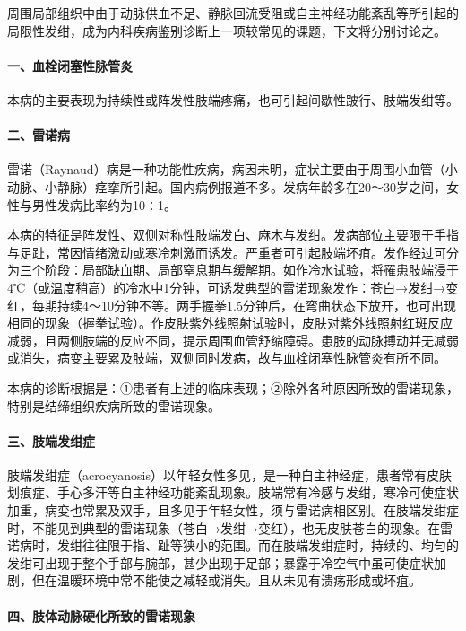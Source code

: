 周围局部组织中由于动脉供血不足、静脉回流受阻或自主神经功能紊乱等所引起的局限性发绀，成为内科疾病鉴别诊断上一项较常见的课题，下文将分别讨论之。

\paragraph{一、血栓闭塞性脉管炎}

本病的主要表现为持续性或阵发性肢端疼痛，也可引起间歇性跛行、肢端发绀等。

\paragraph{二、雷诺病}

雷诺（Raynaud）病是一种功能性疾病，病因未明，症状主要由于周围小血管（小动脉、小静脉）痉挛所引起。国内病例报道不多。发病年龄多在20～30岁之间，女性与男性发病比率约为10∶1。

本病的特征是阵发性、双侧对称性肢端发白、麻木与发绀。发病部位主要限于手指与足趾，常因情绪激动或寒冷刺激而诱发。严重者可引起肢端坏疽。发作经过可分为三个阶段：局部缺血期、局部窒息期与缓解期。如作冷水试验，将罹患肢端浸于4℃（或温度稍高）的冷水中1分钟，可诱发典型的雷诺现象发作：苍白→发绀→变红，每期持续4～10分钟不等。两手握拳1.5分钟后，在弯曲状态下放开，也可出现相同的现象（握拳试验）。作皮肤紫外线照射试验时，皮肤对紫外线照射红斑反应减弱，且两侧肢端的反应不同，提示周围血管舒缩障碍。患肢的动脉搏动并无减弱或消失，病变主要累及肢端，双侧同时发病，故与血栓闭塞性脉管炎有所不同。

本病的诊断根据是：①患者有上述的临床表现；②除外各种原因所致的雷诺现象，特别是结缔组织疾病所致的雷诺现象。

\paragraph{三、肢端发绀症}

肢端发绀症（acrocyanosis）以年轻女性多见，是一种自主神经症，患者常有皮肤划痕症、手心多汗等自主神经功能紊乱现象。肢端常有冷感与发绀，寒冷可使症状加重，病变也常累及双手，且多见于年轻女性，须与雷诺病相区别。在肢端发绀症时，不能见到典型的雷诺现象（苍白→发绀→变红），也无皮肤苍白的现象。在雷诺病时，发绀往往限于指、趾等狭小的范围。而在肢端发绀症时，持续的、均匀的发绀可出现于整个手部与腕部，甚少出现于足部；暴露于冷空气中虽可使症状加剧，但在温暖环境中常不能使之减轻或消失。且从未见有溃疡形成或坏疽。

\paragraph{四、肢体动脉硬化所致的雷诺现象}

